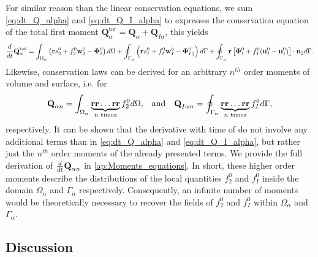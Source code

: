 For similar reason than the linear conservation equations, we sum \ref{eq:dt_Q_alpha} and \ref{eq:dt_Q_I_alpha} to expresses the conservation equation of the total first moment $\textbf{Q}_\alpha^\text{tot} = \textbf{Q}_\alpha + \textbf{Q}_{I\alpha}$, this yields 
\begin{multline}
    \frac{d}{dt} {\textbf{Q}_\alpha^\text{tot}}
    = \int_{\Omega_\alpha}  \left(
        \textbf{r} s_2^0         
        + f_2^0  \textbf{w}_2^0 
        - \mathbf{\Phi}_2^0
    \right)  d\Omega
    + \oint_{\Gamma_\alpha}  \left(
        \textbf{r}s_I^0
        + f_I^0 \textbf{w}_I^0
        - \mathbf{\Phi}_{I||}^0
    \right)  d\Gamma
    + \oint_{\Gamma_\alpha}  \textbf{r} \left[
        \mathbf{\Phi}_1^0
        + f_1^0 (\textbf{u}_I^0-\textbf{u}_1^0)
    \right]\cdot \textbf{n}_2   d\Gamma. 
    \label{eq:dt_Q_alpha_tot}
\end{multline}
Likewise, conservation laws can be derived for an arbitrary $n^{th}$ order moments of volume and surface, i.e. for
\begin{align}
    \textbf{Q}_{\alpha n}
    = \int_{\Omega_\alpha} 
         \underbrace{\textbf{rr}\ldots \textbf{rr}}_{n\text{ times}}
        f_2^0  d\Omega,
        && \text{and} &&
    \textbf{Q}_{I\alpha n}
    = \oint_{\Gamma_\alpha} 
         \underbrace{\textbf{rr}\ldots \textbf{rr}}_{n\text{ times}}
    f_I^0  d\Gamma,
    \label{eq:Q_n_definition}
\end{align} 
respectively. 
It can be shown that the derivative with time of do not involve any additional terms than in \ref{eq:dt_Q_alpha} and \ref{eq:dt_Q_I_alpha}, but rather just the $n^{th}$ order moments of the already presented terms.
We provide the full derivation of $\frac{d}{dt}{ \textbf{Q}_{\alpha n}}$ in \ref{ap:Moments_equations}.
In short, these higher order moments describe the distributions of the local quantities $f_2^0$ and $f_I^0$ inside the domain $\Omega_\alpha$ and $\Gamma_\alpha$ respectively.
Consequently, an infinite number of moments would be theoretically necessary to recover the fields of $f_2^0$ and $f_I^0$  within $\Omega_\alpha$ and $\Gamma_\alpha$. 


\subsection{Discussion}

